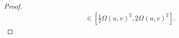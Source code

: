 \documentclass{article}
\newcommand{\Q}{\mathcal{Q}}
\begin{document}
\begin{proof}
\begin{equation}
\begin{split}
        &\in\left[\frac{1}{2}\Omega(u,v)^2,2\Omega(u,v)^2\right].
    \end{split}
\end{equation}

\end{proof}
\end{document}
